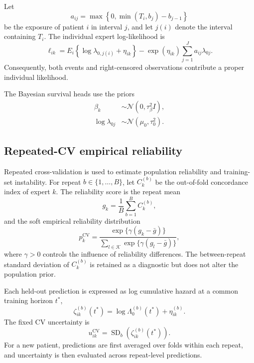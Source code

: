Let
\begin{equation}
    a_{ij}=\max\!\left\{0,\min(T_i,b_j)-b_{j-1}\right\}
\end{equation}
be the exposure of patient $i$ in interval $j$, and let $j(i)$ denote the
interval containing $T_i$. The individual expert log-likelihood is
\begin{equation}
    \ell_{ik}
    =E_i\left\{\log\lambda_{0,j(i)}+\eta_{ik}\right\}
    -\exp(\eta_{ik})\sum_{j=1}^{J}a_{ij}\lambda_{0j}.
\label{eq:piecewise-loglik}
\end{equation}
Consequently, both events and right-censored observations contribute a proper
individual likelihood.

The Bayesian survival heads use the priors
\begin{align}
    \beta_k &\sim \mathcal N(0,\tau_\beta^2 I), \\
    \log\lambda_{0j} &\sim \mathcal N(\mu_0,\tau_0^2).
\end{align}

\subsection{Repeated-CV empirical reliability}

Repeated cross-validation is used to estimate population reliability and
training-set instability. For repeat $b\in\{1,\ldots,B\}$, let $C_k^{(b)}$ be
the out-of-fold concordance index of expert $k$. The reliability score is the
repeat mean
\begin{equation}
    g_k=\frac{1}{B}\sum_{b=1}^{B}C_k^{(b)},
\end{equation}
and the soft empirical reliability distribution
\begin{equation}
    p_k^{\mathrm{CV}}
    =\frac{\exp\{\gamma(g_k-\bar g)\}}
    {\sum_{l\in\mathcal K}\exp\{\gamma(g_l-\bar g)\}},
\label{eq:cv-reliability}
\end{equation}
where $\gamma>0$ controls the influence of reliability differences. The
between-repeat standard deviation of $C_k^{(b)}$ is retained as a diagnostic
but does not alter the population prior.

Each held-out prediction is expressed as log cumulative hazard at a common
training horizon $t^*$,
\begin{equation}
    \zeta_{ik}^{(b)}(t^*)
    =\log\Lambda_{0}^{(b)}(t^*)+\eta_{ik}^{(b)}.
\end{equation}
The fixed CV uncertainty is
\begin{equation}
    u_{ik}^{\mathrm{CV}}
    =\operatorname{SD}_{b}\!\left(\zeta_{ik}^{(b)}(t^*)\right).
\end{equation}
For a new patient, predictions are first averaged over folds within each repeat,
and uncertainty is then evaluated across repeat-level predictions.

